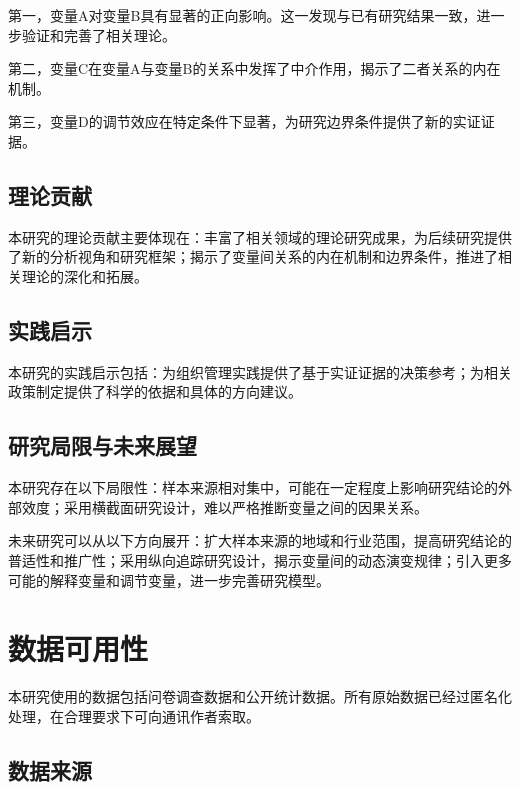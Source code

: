 \documentclass[numbering=arabic,fontset=auto]{jnuthesis}
\begin{document}
第一，变量A对变量B具有显著的正向影响。这一发现与已有研究结果一致，进一步验证和完善了相关理论。

第二，变量C在变量A与变量B的关系中发挥了中介作用，揭示了二者关系的内在机制。

第三，变量D的调节效应在特定条件下显著，为研究边界条件提供了新的实证证据。

\section{理论贡献}

本研究的理论贡献主要体现在：丰富了相关领域的理论研究成果，为后续研究提供了新的分析视角和研究框架；揭示了变量间关系的内在机制和边界条件，推进了相关理论的深化和拓展。

\section{实践启示}

本研究的实践启示包括：为组织管理实践提供了基于实证证据的决策参考；为相关政策制定提供了科学的依据和具体的方向建议。

\section{研究局限与未来展望}

本研究存在以下局限性：样本来源相对集中，可能在一定程度上影响研究结论的外部效度；采用横截面研究设计，难以严格推断变量之间的因果关系。

未来研究可以从以下方向展开：扩大样本来源的地域和行业范围，提高研究结论的普适性和推广性；采用纵向追踪研究设计，揭示变量间的动态演变规律；引入更多可能的解释变量和调节变量，进一步完善研究模型。


\printbibliography[title={参考文献}]

\appendix

\chapter{数据可用性}

本研究使用的数据包括问卷调查数据和公开统计数据。所有原始数据已经过匿名化处理，在合理要求下可向通讯作者索取。

\section{数据来源}
\end{document}
